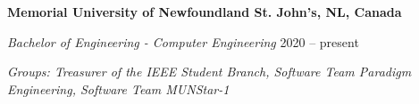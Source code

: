\textbf{Memorial University of Newfoundland \hfill St. John's, NL, Canada} \par
\textit{Bachelor of Engineering - Computer Engineering} \hfill 2020 -- present\par
\textit{Groups: Treasurer of the IEEE Student Branch, Software Team Paradigm Engineering, Software Team MUNStar-1}